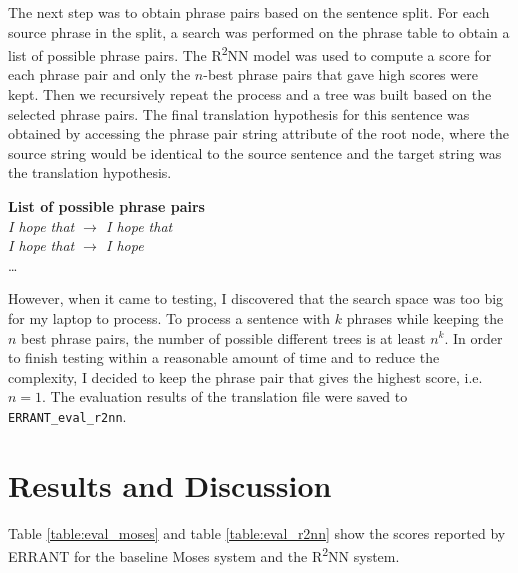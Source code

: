 \documentclass[12pt,a4paper,twoside]{report}
\begin{document}
The next step was to obtain phrase pairs based on the sentence split. For each source phrase in the split, a search was performed on the phrase table to obtain a list of possible phrase pairs. The R\textsuperscript{2}NN model was used to compute a score for each phrase pair and only the $n$-best phrase pairs that gave high scores were kept. Then we recursively repeat the process and a tree was built based on the selected phrase pairs. The final translation hypothesis for this sentence was obtained by accessing the phrase pair string attribute of the root node, where the source string would be identical to the source sentence and the target string was the translation hypothesis.

\hfill\begin{minipage}{\dimexpr\textwidth-0.8cm}
    \vspace*{1mm}
    \textbf{List of possible phrase pairs}\\
    \textit{I hope that $\rightarrow$ I hope that}\\
    \textit{I hope that $\rightarrow$ I hope}\\
    \dots
    \vspace*{1mm}
\end{minipage}

However, when it came to testing, I discovered that the search space was too big for my laptop to process. To process a sentence with $k$ phrases while keeping the $n$ best phrase pairs, the number of possible different trees is at least $n^k$. In order to finish testing within a reasonable amount of time and to reduce the complexity, I decided to keep the phrase pair that gives the highest score, i.e. $n=1$. The evaluation results of the translation file were saved to \texttt{ERRANT\_eval\_r2nn}.

\section{Results and Discussion}\label{section:results}
Table \ref{table:eval_moses} and table \ref{table:eval_r2nn} show the scores reported by ERRANT for the baseline Moses system and the R\textsuperscript{2}NN system.
\end{document}
